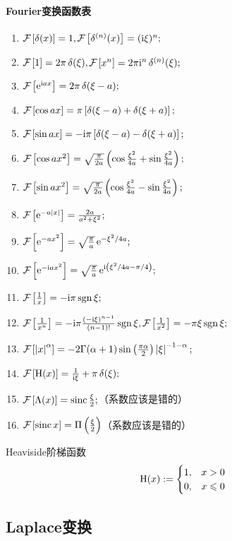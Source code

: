 \paragraph*{Fourier变换函数表}
\begin{enumerate}
	\item $\cf{\delta(x)}=1,$\qquad$\cf{\delta^{(n)}(x)}=(\i\xi)^n;$
	\item $\cf 1=2\pi\vd(\xi),$\qquad$\cf{x^n}=2\pi\i^n\vd^{(n)}(\xi);$
	\item $\cf{\e{\i ax}}=2\pi\vd(\xi-a);$
	\item $\cf{\cos ax}=\pi\fkh{\delta(\xi-a)+\delta(\xi+a)};$
	\item $\cf{\sin ax}=-\i\pi\fkh{\delta(\xi-a)-\delta(\xi+a)};$
	\item $\cf{\cos ax^2}=\sqrt{\frac\pi{2a}}\kh{\cos\frac{\xi^2}{4a}+\sin\frac{\xi^2}{4a}};$
	\item $\cf{\sin ax^2}=\sqrt{\frac\pi{2a}}\kh{\cos\frac{\xi^2}{4a}-\sin\frac{\xi^2}{4a}};$
	\item $\cf{\e{-a\abs x}}=\frac{2a}{a^2+\xi^2};$
	\item $\cf{\e{-ax^2}}=\sqrt{\frac\pi{a}}\e{-\xi^2/4a};$
	\item $\cf{\e{-\i ax^2}}=\sqrt{\frac\pi{a}}\e{\i\kh{\xi^2/4a-\pi/4}};$
	\item $\cf{\frac1x}=-\i\pi\sgn\xi;$
	\item $\cf{\frac1{x^n}}=-\i\pi\frac{(-\i\xi)^{n-1}}{(n-1)!}\sgn\xi,$\qquad$\cf{\frac1{x^2}}=-\pi\xi\sgn\xi;$
	\item $\cf{\abs x^\alpha}=-2\Gamma(\alpha+1)\sin\kh{\frac{\pi\alpha}2}\abs\xi^{-1-\alpha};$
	\item $\cf{\Heaviside(x)}=\frac1{\i\xi}+\pi\vd(\xi);$
	\item $\cf{\Lambda(x)}=\sinc\frac\xi{2};$（系数应该是错的）
	\item $\cf{\sinc x}=\Pi\kh{\frac\xi{2}}$（系数应该是错的）
\end{enumerate}
Heaviside阶梯函数
\[
	\Heaviside(x):=\begin{cases}
	1,&x>0\\
	0,&x\leqslant 0
	\end{cases}
\]
\subsection{Laplace变换}
